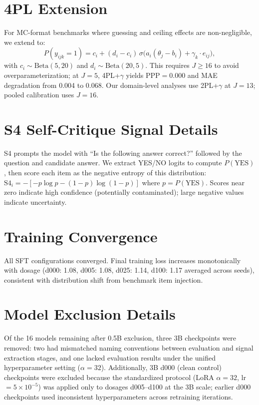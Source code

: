 \section{4PL Extension}
\label{sec:4pl_details}

For MC-format benchmarks where guessing and ceiling effects are non-negligible, we extend to:
\begin{equation}
    P(y_{ijk} = 1) = c_i + (d_i - c_i)\,\sigma\!\bigl(a_i(\theta_j - b_i) + \gamma_k \cdot e_{ij}\bigr),
\end{equation}
with $c_i \sim \text{Beta}(5,20)$ and $d_i \sim \text{Beta}(20,5)$. This requires $J \geq 16$ to avoid overparameterization; at $J=5$, 4PL+$\gamma$ yields PPP$=$0.000 and MAE degradation from 0.004 to 0.068. Our domain-level analyses use 2PL+$\gamma$ at $J=13$; pooled calibration uses $J=16$.

\section{S4 Self-Critique Signal Details}
\label{sec:s4_details}

S4 prompts the model with ``Is the following answer correct?'' followed by the question and candidate answer. We extract YES/NO logits to compute $P(\text{YES})$, then score each item as the negative entropy of this distribution: $\text{S4}_i = -[-p\log p - (1-p)\log(1-p)]$ where $p = P(\text{YES})$. Scores near zero indicate high confidence (potentially contaminated); large negative values indicate uncertainty.

\section{Training Convergence}
\label{sec:training_convergence}

All SFT configurations converged. Final training loss increases monotonically with dosage (d000: 1.08, d005: 1.08, d025: 1.14, d100: 1.17 averaged across seeds), consistent with distribution shift from benchmark item injection.

\section{Model Exclusion Details}
\label{sec:exclusion_details}

Of the 16 models remaining after 0.5B exclusion, three 3B checkpoints were removed: two had mismatched naming conventions between evaluation and signal extraction stages, and one lacked evaluation results under the unified hyperparameter setting ($\alpha=32$). Additionally, 3B d000 (clean control) checkpoints were excluded because the standardized protocol (LoRA $\alpha=32$, lr$=5\times10^{-5}$) was applied only to dosages d005--d100 at the 3B scale; earlier d000 checkpoints used inconsistent hyperparameters across retraining iterations.


